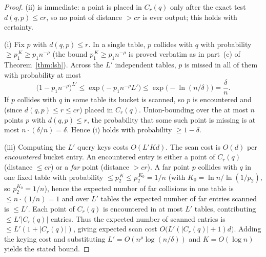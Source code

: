 \documentclass{amsart}
\begin{document}
\begin{proof}
(ii) is immediate: a point is placed in $C_r(q)$ only after the exact test
$d(q,p)\le cr$, so no point of distance $>cr$ is ever output; this holds with
certainty.

(i) Fix $p$ with $d(q,p)\le r$.  In a single table, $p$ collides with $q$ with
probability $\ge p_1^{\,K}\ge p_1 n^{-\rho}$ (the bound $p_1^{\,K}\ge p_1 n^{-\rho}$ is
proved verbatim as in part~(c) of Theorem~\ref{thm:lsh}).  Across the $L'$ independent
tables, $p$ is missed in all of them with probability at most
\[
\big(1-p_1 n^{-\rho}\big)^{L'}\le \exp\!\big(-p_1 n^{-\rho} L'\big)
\le \exp\!\big(-\ln(n/\delta)\big)=\frac{\delta}{n}.
\]
If $p$ collides with $q$ in some table its bucket is scanned, so $p$ is encountered and
(since $d(q,p)\le r\le cr$) placed in $C_r(q)$.  Union-bounding over the at most $n$
points $p$ with $d(q,p)\le r$, the probability that some such point is missing is at
most $n\cdot(\delta/n)=\delta$.  Hence (i) holds with probability $\ge 1-\delta$.

(iii) Computing the $L'$ query keys costs $O(L'Kd)$.  The scan cost is $O(d)$ per
\emph{encountered} bucket entry.  An encountered entry is either a point of
$C_r(q)$ (distance $\le cr$) or a \emph{far} point (distance $>cr$).  A far point $p$
collides with $q$ in one fixed table with probability $\le p_2^{\,K}\le p_2^{\,K_0}=1/n$
(with $K_0=\ln n/\ln(1/p_2)$, so $p_2^{K_0}=1/n$), hence the expected number of
far collisions in one table is $\le n\cdot(1/n)=1$ and over $L'$ tables the expected
number of far entries scanned is $\le L'$.  Each point of $C_r(q)$ is encountered in at
most $L'$ tables, contributing $\le L'|C_r(q)|$ entries.  Thus the expected number of
scanned entries is $\le L'(1+|C_r(q)|)$, giving expected scan cost
$O\big(L'(|C_r(q)|+1)d\big)$.  Adding the keying cost and substituting
$L'=O(n^{\rho}\log(n/\delta))$ and $K=O(\log n)$ yields the stated bound.
\end{proof}
\end{document}
